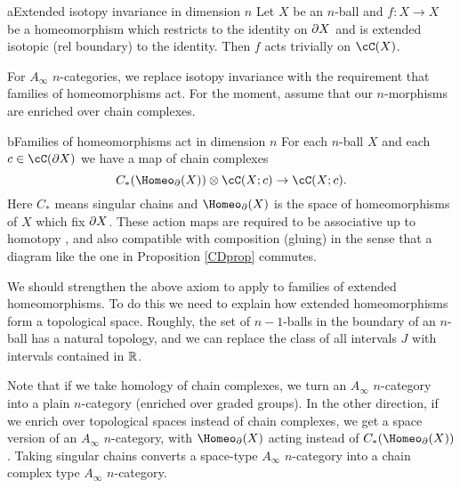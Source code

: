 \begin{axiom-numbered}{a}{Extended isotopy invariance in dimension $n$}
\label{axiom:extended-isotopies}
Let $X$ be an $n$-ball and $f: X\to X$ be a homeomorphism which restricts
to the identity on $\partial X$ and is extended isotopic (rel boundary) to the identity.
Then $f$ acts trivially on $\cC(X)$.
\end{axiom-numbered}


\smallskip

For $A_\infty$ $n$-categories, we replace
isotopy invariance with the requirement that families of homeomorphisms act.
For the moment, assume that our $n$-morphisms are enriched over chain complexes.

\begin{axiom-numbered}{b}{Families of homeomorphisms act in dimension $n$}
For each $n$-ball $X$ and each $c\in \cC(\bd X)$ we have a map of chain complexes
\[
	C_*(\Homeo_\bd(X))\ot \cC(X; c) \to \cC(X; c) .
\]
Here $C_*$ means singular chains and $\Homeo_\bd(X)$ is the space of homeomorphisms of $X$
which fix $\partial X$.
These action maps are required to be associative up to homotopy
, and also compatible with composition (gluing) in the sense that
a diagram like the one in Proposition \ref{CDprop} commutes.
\end{axiom-numbered}

We should strengthen the above axiom to apply to families of extended homeomorphisms.
To do this we need to explain how extended homeomorphisms form a topological space.
Roughly, the set of $n{-}1$-balls in the boundary of an $n$-ball has a natural topology,
and we can replace the class of all intervals $J$ with intervals contained in $\mathbb{R}$.

Note that if we take homology of chain complexes, we turn an $A_\infty$ $n$-category
into a plain $n$-category (enriched over graded groups).
In the other direction, if we enrich over topological spaces instead of chain complexes,
we get a space version of an $A_\infty$ $n$-category, with $\Homeo_\bd(X)$ acting 
instead of  $C_*(\Homeo_\bd(X))$.
Taking singular chains converts a space-type $A_\infty$ $n$-category into a chain complex
type $A_\infty$ $n$-category.

